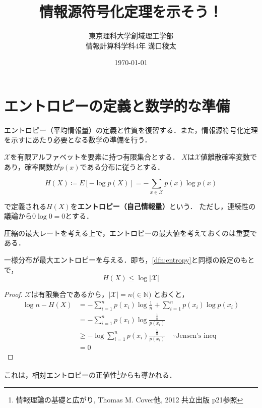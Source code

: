 \documentclass{classes/myclass}
\title{情報源符号化定理を示そう！}
\author{東京理科大学創域理工学部 \\ 情報計算科学科4年 溝口稜太}
\date{\today}
\begin{document}
\maketitle

\section{エントロピーの定義と数学的な準備}

エントロピー（平均情報量）の定義と性質を復習する．また，情報源符号化定理を示すにあたり必要となる数学の準備を行う．

\begin{dfn}[エントロピー]\label{dfn:entropy}
$\mathcal{X}$を有限アルファベットを要素に持つ有限集合とする．
$X$は$\mathcal{X}$値離散確率変数であり，確率関数が$p(x)$である分布に従うとする．

\[
  H(X) \coloneq E[-\log p(X)] = -\sum_{x \in \mathcal{X}}p(x) \log p(x)
\]

で定義される$H(X)$を\textbf{エントロピー（自己情報量）}という．
ただし，連続性の議論から$0 \log 0 = 0$とする．
\end{dfn}


圧縮の最大レートを考える上で，エントロピーの最大値を考えておくのは重要である．

\begin{thm}[エントロピーの最大値]
一様分布が最大エントロピーを与える．即ち，\ref{dfn:entropy}と同様の設定のもとで，
\[
  H(X) \leq \log |\mathcal{X}|
\]
\end{thm}

\begin{proof}
  $\mathcal{X}$は有限集合であるから，$|\mathcal{X}| = n \lparen \in \mathbb{N} \rparen$ とおくと，
\begin{align*}
  \log n - H(X) 
  &= -\sum_{i = 1}^{n} p(x_i) \log \frac{1}{n} + \sum_{i = 1}^{n} p(x_i) \log p(x_i) \\
  &= -\sum_{i = 1}^n p(x_i) \log \frac{\frac{1}{n}}{p(x_i)} \\
  &\geq - \log \sum_{i = 1}^n p(x_i) \frac{\frac{1}{n}}{p(x_i)} \quad \because \text{Jensen's ineq}\\
  &= 0
\end{align*}
\end{proof}

これは，相対エントロピーの正値性\footnote{情報理論の基礎と広がり, Thomas M. Cover他, 2012 共立出版 p21参照  }からも導かれる．
\end{document}
